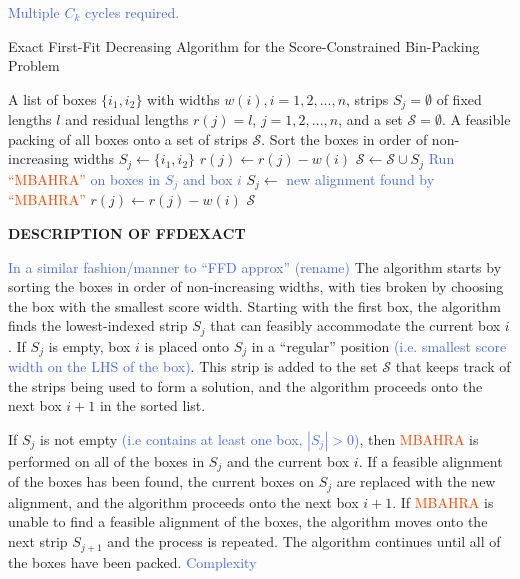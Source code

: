 \documentclass[oribibl]{llncs}
\begin{document}
\textcolor{RoyalBlue}{Multiple $C_k$ cycles required.}

\begin{algorithm}[H]
	\caption{\textcolor{OliveGreen}{Exact First-Fit Decreasing Algorithm for the Score-Constrained Bin-Packing Problem}}

	\begin{algorithmic}[1]
	\Require A list of boxes $\{i_1, i_2\}$ with widths $w(i), i = 1, 2, ..., n$, strips $S_j = \emptyset$ of fixed lengths $l$ and residual lengths $r(j) = l$, $j = 1, 2, ...,n$, and a set $\mathcal{S} = \emptyset$.
	\Ensure A feasible packing of all boxes onto a set of strips $\mathcal{S}$.
	\State Sort the boxes in order of non-increasing widths
				\State $S_j \gets \{i_1, i_2\}$
				\State $r(j) \gets r(j) - w(i)$
				\State $\mathcal{S} \gets \mathcal{S} \cup S_j$
				\Break
				\State \textcolor{RoyalBlue}{Run} \textcolor{OrangeRed}{``MBAHRA''} \textcolor{RoyalBlue}{on boxes in $S_j$ and box $i$}
					\State $S_j \gets$ \textcolor{RoyalBlue}{new alignment found by} \textcolor{OrangeRed}{``MBAHRA''}
					\State $r(j) \gets r(j) - w(i)$
					\Break
				\EndIf
			\EndIf
		\EndFor
	\EndFor
	\Return $\mathcal{S}$
	\end{algorithmic}	
\end{algorithm}

\textbf{\textcolor{ProcessBlue}{DESCRIPTION OF FFDEXACT}}

\textcolor{RoyalBlue}{In a similar fashion/manner to ``FFD approx'' (rename)} The algorithm starts by sorting the boxes in order of non-increasing widths, with ties broken by choosing the box with the smallest score width. Starting with the first box, the algorithm finds the lowest-indexed strip $S_j$ that can feasibly accommodate the current box $i$. If $S_j$ is empty, box $i$ is placed onto $S_j$ in a ``regular'' position \textcolor{RoyalBlue}{(i.e. smallest score width on the LHS of the box)}. This strip is added to the set $\mathcal{S}$ that keeps track of the strips being used to form a solution, and the algorithm proceeds onto the next box $i+1$ in the sorted list.

If $S_j$ is not empty \textcolor{RoyalBlue}{(i.e contains at least one box, $|S_j| > 0$)}, then \textcolor{OrangeRed}{MBAHRA} is performed on all of the boxes in $S_j$ and the current box $i$. If a feasible alignment of the boxes has been found, the current boxes on $S_j$ are replaced with the new alignment, and the algorithm proceeds onto the next box $i+1$. If \textcolor{OrangeRed}{MBAHRA} is unable to find a feasible alignment of the boxes, the algorithm moves onto the next strip $S_{j+1}$ and the process is repeated. The algorithm continues until all of the boxes have been packed. \textcolor{RoyalBlue}{Complexity}
\end{document}
